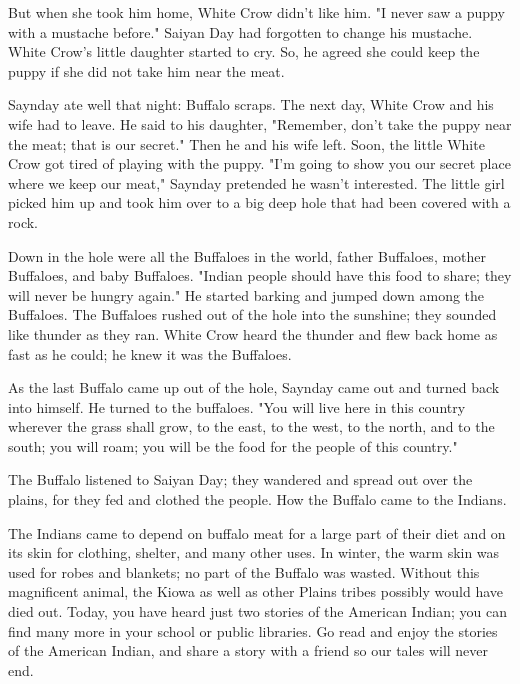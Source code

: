 But when she took him home, White Crow didn't like him. "I never saw a puppy with a mustache before." Saiyan Day had forgotten to change his mustache. White Crow's little daughter started to cry. So, he agreed she could keep the puppy if she did not take him near the meat.

Saynday ate well that night: Buffalo scraps. The next day, White Crow and his wife had to leave. He said to his daughter, "Remember, don't take the puppy near the meat; that is our secret." Then he and his wife left. Soon, the little White Crow got tired of playing with the puppy. "I'm going to show you our secret place where we keep our meat," Saynday pretended he wasn't interested. The little girl picked him up and took him over to a big deep hole that had been covered with a rock.

Down in the hole were all the Buffaloes in the world, father Buffaloes, mother Buffaloes, and baby Buffaloes. "Indian people should have this food to share; they will never be hungry again." He started barking and jumped down among the Buffaloes. The Buffaloes rushed out of the hole into the sunshine; they sounded like thunder as they ran. White Crow heard the thunder and flew back home as fast as he could; he knew it was the Buffaloes.

As the last Buffalo came up out of the hole, Saynday came out and turned back into himself. He turned to the buffaloes. "You will live here in this country wherever the grass shall grow, to the east, to the west, to the north, and to the south; you will roam; you will be the food for the people of this country."

The Buffalo listened to Saiyan Day; they wandered and spread out over the plains, for they fed and clothed the people. How the Buffalo came to the Indians.

The Indians came to depend on buffalo meat for a large part of their diet and on its skin for clothing, shelter, and many other uses. In winter, the warm skin was used for robes and blankets; no part of the Buffalo was wasted. Without this magnificent animal, the Kiowa as well as other Plains tribes possibly would have died out. Today, you have heard just two stories of the American Indian; you can find many more in your school or public libraries. Go read and enjoy the stories of the American Indian, and share a story with a friend so our tales will never end.